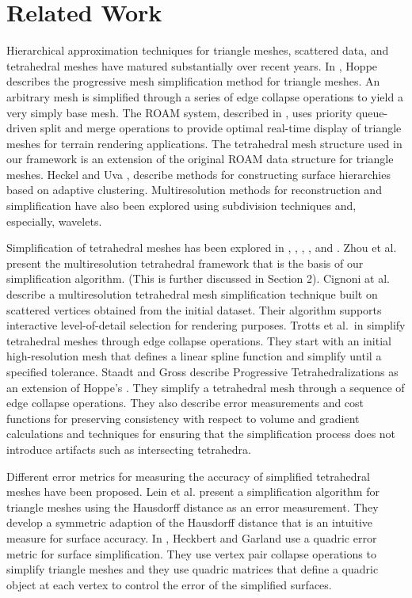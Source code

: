 \documentclass{siggraph}
\begin{document}
\section{Related Work}

Hierarchical approximation techniques for triangle meshes, scattered
data, and tetrahedral meshes have matured substantially over recent
years.  In \cite{Hoppe:1996:PM}, Hoppe describes the progressive mesh
simplification method for triangle meshes.  An arbitrary mesh is
simplified through a series of edge collapse operations to yield a
very simply base mesh.  The ROAM system, described in
\cite{EVL-1997-123}, uses priority queue-driven split and merge
operations to provide optimal real-time display of triangle meshes for
terrain rendering applications.  The tetrahedral mesh structure used in
our framework is an extension of the original ROAM data structure for
triangle meshes.  Heckel and Uva \cite{HeckelUva:2000},
\cite{HeckelUva:1998} describe methods for constructing surface
hierarchies based on adaptive clustering.  Multiresolution methods for
reconstruction and simplification have also been explored using
subdivision techniques and, especially, wavelets.


Simplification of tetrahedral meshes has been explored in
\cite{Zhou:1997:MTF}, \cite{tvcg-1997-27}, \cite{VIS98*287},
\cite{Liu:1995}, and \cite{Staadt:1998:PRM}.  Zhou et al.\
\cite{Zhou:1997:MTF} present the multiresolution tetrahedral framework
that is the basis of our simplification algorithm.  (This is further
discussed in Section 2).  Cignoni at al.\ \cite{tvcg-1997-27} describe
a multiresolution tetrahedral mesh simplification technique built on
scattered vertices obtained from the initial dataset.  Their algorithm
supports interactive level-of-detail selection for rendering purposes.
Trotts et al.\ in \cite{VIS98*287} simplify tetrahedral meshes through
edge collapse operations.  They start with an initial high-resolution
mesh that defines a linear spline function and simplify until a
specified tolerance.  Staadt and Gross \cite{Staadt:1998:PRM} describe
Progressive Tetrahedralizations as an extension of Hoppe's
\cite{Hoppe:1996:PM}.  They simplify a tetrahedral mesh through a
sequence of edge collapse operations.  They also describe error
measurements and cost functions for preserving consistency with
respect to volume and gradient calculations and techniques for
ensuring that the simplification process does not introduce artifacts
such as intersecting tetrahedra.


Different error metrics for measuring the accuracy of simplified
tetrahedral meshes have been proposed.  Lein et
al. \cite{Klein:1996:MRE} present a simplification algorithm for
triangle meshes using the Hausdorff distance as an error measurement.
They develop a symmetric adaption of the Hausdorff distance that is an
intuitive measure for surface accuracy.  In \cite{Garland:1997:SSU},
Heckbert and Garland use a quadric error metric for surface
simplification. They use vertex pair collapse operations to simplify
triangle meshes and they use quadric matrices that define a quadric
object at each vertex to control the error of the simplified surfaces.
\end{document}

